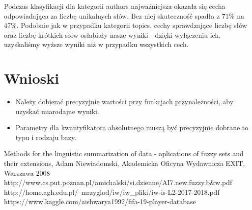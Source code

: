 \documentclass{classrep}
\begin{document}
Podczas klasyfikacji dla kategorii authors najważniejsza okazała się cecha odpowiadająca za liczbę unikalnych słów. Bez niej skuteczność spadła z 71\% na 47\%. Podobnie jak w przypadku kategorii topics, cechy sprawdzające liczbę słów oraz liczbę krótkich słów osłabiały nasze wyniki - dzięki wyłączeniu ich, uzyskaliśmy wyższe wyniki niż w przypadku wszystkich cech. 

	
\section{Wnioski}
\begin{itemize}
	\item Należy dobierać precyzyjnie wartości przy funkcjach przynależności, aby uzyskać miarodajne wyniki.
	\item Parametry dla kwantyfikatora absolutnego muszą być precyzyjnie dobrane to typu i rodzaju bazy. 
\end{itemize}

	

\begin{thebibliography}{}
Methods for the linguistic summarization of data - aplications of fuzzy sets and their extensions, Adam Niewiadomski, Akademicka Oficyna Wydawnicza EXIT, Warszawa 2008
http://www.cs.put.poznan.pl/amichalski/si.dzienne/AI7.new.fuzzy.b&w.pdf
http://home.agh.edu.pl/~mrzyglod/iw/iw_pliki/iw-is-L2-2017-2018.pdf
https://www.kaggle.com/aishwarya1992/fifa-19-player-database
\end{thebibliography}
\end{document}
